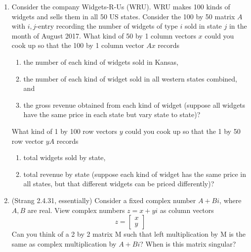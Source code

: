 \documentclass[11pt]{article}
\begin{document}
\begin{enumerate}
\item Consider the company Widgets-R-Us (WRU).  WRU makes 100 kinds of widgets and sells them in all 50 US states.  Consider the 100 by 50 matrix $A$ with $i,j$-entry recording the number of widgets of type $i$ sold in state $j$ in the month of August 2017.  What kind of 50 by 1 column vectors $x$ could you cook up so that the 100 by 1 column vector $Ax$ records 
\begin{enumerate}
\item the number of each kind of widgets sold in Kansas, 
\item the number of each kind of widget sold in all western states combined, and 
\item the gross revenue obtained from each kind of widget (suppose all widgets have the same price in each state but vary state to state)?  
\end{enumerate}
What kind of 1 by 100 row vectors $y$ could you cook up so that the 1 by 50 row vector $yA$ records 
\begin{enumerate}
\item total widgets sold by state, 
\item total revenue by state (suppose each kind of widget has the same price in all states, but that different widgets can be priced differently)?
\end{enumerate}

\item (Strang 2.4.31, essentially)  Consider a fixed complex number $A + Bi$, where 
$A, B$ are real.  View complex numbers $z = x +yi$ as column vectors 
\[z = \begin{bmatrix} x \\ y \end{bmatrix} \]
Can you think of a 2 by 2 matrix M such that left multiplication by M is the same as complex multiplication by $A + Bi$?  When is this matrix singular?

\end{enumerate}
\end{document}
